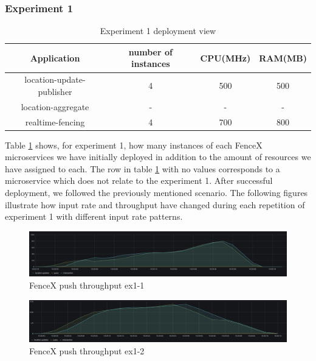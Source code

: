 \documentclass[a4]{report}
\begin{document}
    \subsubsection{Experiment 1}
    \begin{table}[h!]
        \centering
        \begin{tabular}{|c|c|c|c|}
            \hline
            Application               & number of instances & CPU(MHz) & RAM(MB) \\
            \hline
            location-update-publisher & 4                   & 500      & 500     \\
            location-aggregate        & -                   & -        & -       \\
            realtime-fencing          & 4                   & 700      & 800     \\
            \hline
        \end{tabular}
        \caption{Experiment 1 deployment view}
        \label{table:ex1-dv}
    \end{table}

    Table \ref{table:ex1-dv} shows, for experiment 1, how many instances of each FenceX microservices we have initially
    deployed in addition to the amount of resources we have assigned to each.
    The row in table \ref{table:ex1-dv} with no values corresponds to a microservice which does not relate to the
    experiment 1.
    After successful deployment, we followed the previously mentioned scenario.
    The following figures illustrate how input rate and throughput have changed during each repetition of experiment 1
    with different input rate patterns.

    \begin{figure}[h!]
        \centering
        \caption{FenceX push throughput ex1-1}
        \label{fig:ex1-1}
        \includegraphics[width=\linewidth, scale=2]{images/evaluation/ex1-benchmarking(15,6).png}
    \end{figure}

    \begin{figure}[h!]
        \centering
        \caption{FenceX push throughput ex1-2}
        \label{fig:ex1-2}
        \includegraphics[width=\linewidth, scale=2]{images/evaluation/ex1-benchmarking(19,7).png}
    \end{figure}
\end{document}
